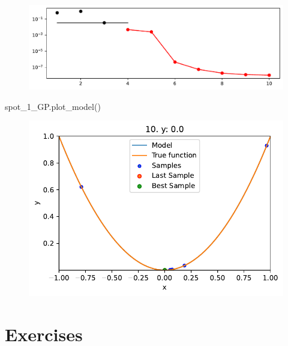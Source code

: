 \documentclass[
  letterpaper,
  DIV=11,
  numbers=noendperiod]{scrreprt}
\newenvironment{Shaded}{\begin{snugshade}}{\end{snugshade}}
\newcommand{\NormalTok}[1]{\textcolor[rgb]{0.00,0.23,0.31}{#1}}
\begin{document}
\begin{figure}[H]

{\centering \includegraphics{04_spot_sklearn_surrogate_files/figure-pdf/cell-27-output-1.pdf}

}

\end{figure}

\begin{Shaded}
\begin{Highlighting}[]
\NormalTok{spot\_1\_GP.plot\_model()}
\end{Highlighting}
\end{Shaded}

\begin{figure}[H]

{\centering \includegraphics{04_spot_sklearn_surrogate_files/figure-pdf/cell-28-output-1.pdf}

}

\end{figure}

\hypertarget{exercises-2}{%
\section{Exercises}\label{exercises-2}}
\end{document}
